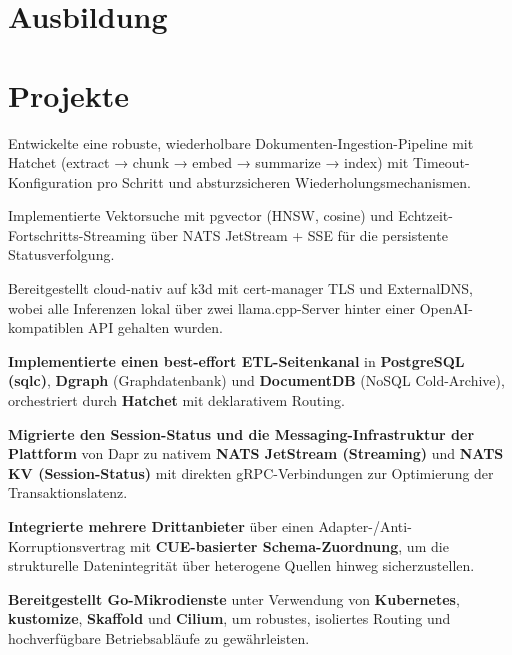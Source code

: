 \documentclass[10pt,a4paper]{resume}
\begin{document}
\section{Ausbildung}

\vspace{2pt}

\section{Projekte}

\bullets
  \item Entwickelte eine robuste, wiederholbare Dokumenten-Ingestion-Pipeline mit Hatchet (extract → chunk → embed → summarize → index) mit Timeout-Konfiguration pro Schritt und absturzsicheren Wiederholungsmechanismen.
  \item Implementierte Vektorsuche mit pgvector (HNSW, cosine) und Echtzeit-Fortschritts-Streaming über NATS JetStream + SSE für die persistente Statusverfolgung.
  \item Bereitgestellt cloud-nativ auf k3d mit cert-manager TLS und ExternalDNS, wobei alle Inferenzen lokal über zwei llama.cpp-Server hinter einer OpenAI-kompatiblen API gehalten wurden.
\bulletsend
\vspace{1.0pt}
\bullets
  \item \textbf{Implementierte einen best-effort ETL-Seitenkanal} in \textbf{PostgreSQL (sqlc)}, \textbf{Dgraph} (Graphdatenbank) und \textbf{DocumentDB} (NoSQL Cold-Archive), orchestriert durch \textbf{Hatchet} mit deklarativem Routing.
  \item \textbf{Migrierte den Session-Status und die Messaging-Infrastruktur der Plattform} von Dapr zu nativem \textbf{NATS JetStream (Streaming)} und \textbf{NATS KV (Session-Status)} mit direkten gRPC-Verbindungen zur Optimierung der Transaktionslatenz.
  \item \textbf{Integrierte mehrere Drittanbieter} über einen Adapter-/Anti-Korruptionsvertrag mit \textbf{CUE-basierter Schema-Zuordnung}, um die strukturelle Datenintegrität über heterogene Quellen hinweg sicherzustellen.
  \item \textbf{Bereitgestellt Go-Mikrodienste} unter Verwendung von \textbf{Kubernetes}, \textbf{kustomize}, \textbf{Skaffold} und \textbf{Cilium}, um robustes, isoliertes Routing und hochverfügbare Betriebsabläufe zu gewährleisten.
\bulletsend
\end{document}
